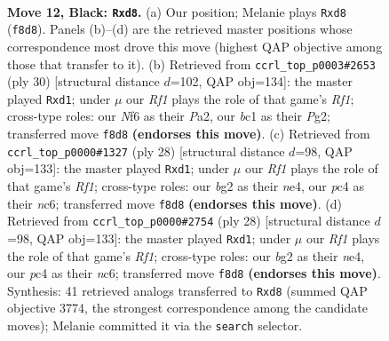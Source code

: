 \documentclass[11pt]{article}
\begin{document}
\clearpage

\begin{figure}[p]\centering
\begin{subfigure}{0.46\textwidth}\centering
\resizebox{\linewidth}{!}{%
\newchessgame
\chessboard[
  setfen={r1bQ1rk1/1pp3bp/p4np1/4pp2/PPP4P/6P1/4PPB1/RNB2RK1 b - - 0 12},
  showmover=false,
  pgfstyle=straightmove, color=movearrow, markmove={f8-d8}
]}
\caption{}
\end{subfigure}\hfill
\begin{subfigure}{0.46\textwidth}\centering
\resizebox{\linewidth}{!}{%
\newchessgame
\chessboard[
  setfen={r1b2rk1/1pp1bpp1/p1n4p/4p3/4P3/1BP3N1/PP3PPP/R1Bq1RK1 w - - 0 16},
  showmover=false,
  pgfstyle=straightmove, color=movearrow, markmove={f1-d1}
]}
\caption{}
\end{subfigure}
\\[4pt]
\begin{subfigure}{0.46\textwidth}\centering
\resizebox{\linewidth}{!}{%
\newchessgame
\chessboard[
  setfen={r1b1r1k1/pp3pp1/2n4p/2P5/2B1n3/P3PN1P/5PP1/R1Bq1RK1 w - - 0 15},
  showmover=false,
  pgfstyle=straightmove, color=movearrow, markmove={f1-d1}
]}
\caption{}
\end{subfigure}\hfill
\begin{subfigure}{0.46\textwidth}\centering
\resizebox{\linewidth}{!}{%
\newchessgame
\chessboard[
  setfen={r1b1r1k1/pp3pp1/2n4p/2P5/2B1n3/P3PN1P/5PP1/R1Bq1RK1 w - - 0 15},
  showmover=false,
  pgfstyle=straightmove, color=movearrow, markmove={f1-d1}
]}
\caption{}
\end{subfigure}
\caption{\textbf{Move 12, Black: \texttt{Rxd8}.} (a) Our position; Melanie plays \texttt{Rxd8} (\texttt{f8d8}). Panels (b)--(d) are the retrieved master positions whose correspondence most drove this move (highest QAP objective among those that transfer to it). (b) Retrieved from \texttt{ccrl\_top\_p0003\#2653} (ply 30) [structural distance $d$=102, QAP obj=134]: the master played \texttt{Rxd1}; under $\mu$ our \emph{Rf1} plays the role of that game's \emph{Rf1}; cross-type roles: our \emph{N}f6 as their \emph{P}a2, our \emph{b}c1 as their \emph{P}g2; transferred move \texttt{f8d8} \textbf{(endorses this move)}. (c) Retrieved from \texttt{ccrl\_top\_p0000\#1327} (ply 28) [structural distance $d$=98, QAP obj=133]: the master played \texttt{Rxd1}; under $\mu$ our \emph{Rf1} plays the role of that game's \emph{Rf1}; cross-type roles: our \emph{b}g2 as their \emph{n}e4, our \emph{p}c4 as their \emph{n}c6; transferred move \texttt{f8d8} \textbf{(endorses this move)}. (d) Retrieved from \texttt{ccrl\_top\_p0000\#2754} (ply 28) [structural distance $d$=98, QAP obj=133]: the master played \texttt{Rxd1}; under $\mu$ our \emph{Rf1} plays the role of that game's \emph{Rf1}; cross-type roles: our \emph{b}g2 as their \emph{n}e4, our \emph{p}c4 as their \emph{n}c6; transferred move \texttt{f8d8} \textbf{(endorses this move)}. Synthesis: 41 retrieved analogs transferred to \texttt{Rxd8} (summed QAP objective 3774, the strongest correspondence among the candidate moves); Melanie committed it via the \texttt{search} selector.}
\label{fig:thought-m23}
\end{figure}
\end{document}
